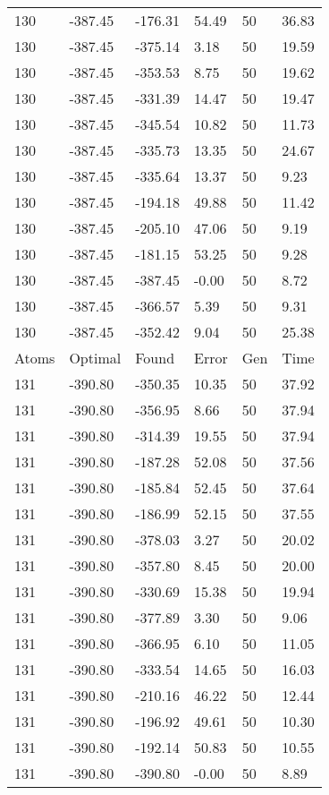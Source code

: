\documentclass{report}
\begin{document}
\begin{appendix}
\begin{longtable}{llllll}
130 & -387.45 & -176.31 & 54.49 & 50 & 36.83 \\
130 & -387.45 & -375.14 & 3.18 & 50 & 19.59 \\
130 & -387.45 & -353.53 & 8.75 & 50 & 19.62 \\
130 & -387.45 & -331.39 & 14.47 & 50 & 19.47 \\
130 & -387.45 & -345.54 & 10.82 & 50 & 11.73 \\
130 & -387.45 & -335.73 & 13.35 & 50 & 24.67 \\
130 & -387.45 & -335.64 & 13.37 & 50 & 9.23 \\
130 & -387.45 & -194.18 & 49.88 & 50 & 11.42 \\
130 & -387.45 & -205.10 & 47.06 & 50 & 9.19 \\
130 & -387.45 & -181.15 & 53.25 & 50 & 9.28 \\
130 & -387.45 & -387.45 & -0.00 & 50 & 8.72 \\
130 & -387.45 & -366.57 & 5.39 & 50 & 9.31 \\
130 & -387.45 & -352.42 & 9.04 & 50 & 25.38 \\
Atoms & Optimal & Found & Error & Gen & Time \\
131 & -390.80 & -350.35 & 10.35 & 50 & 37.92 \\
131 & -390.80 & -356.95 & 8.66 & 50 & 37.94 \\
131 & -390.80 & -314.39 & 19.55 & 50 & 37.94 \\
131 & -390.80 & -187.28 & 52.08 & 50 & 37.56 \\
131 & -390.80 & -185.84 & 52.45 & 50 & 37.64 \\
131 & -390.80 & -186.99 & 52.15 & 50 & 37.55 \\
131 & -390.80 & -378.03 & 3.27 & 50 & 20.02 \\
131 & -390.80 & -357.80 & 8.45 & 50 & 20.00 \\
131 & -390.80 & -330.69 & 15.38 & 50 & 19.94 \\
131 & -390.80 & -377.89 & 3.30 & 50 & 9.06 \\
131 & -390.80 & -366.95 & 6.10 & 50 & 11.05 \\
131 & -390.80 & -333.54 & 14.65 & 50 & 16.03 \\
131 & -390.80 & -210.16 & 46.22 & 50 & 12.44 \\
131 & -390.80 & -196.92 & 49.61 & 50 & 10.30 \\
131 & -390.80 & -192.14 & 50.83 & 50 & 10.55 \\
131 & -390.80 & -390.80 & -0.00 & 50 & 8.89 \\

\end{longtable}
\end{appendix}
\end{document}
